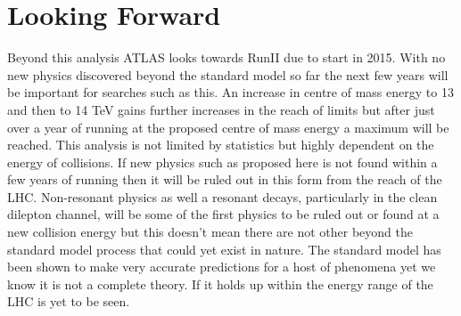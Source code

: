 \section{Looking Forward}

Beyond this analysis ATLAS looks towards RunII due to start in 2015. With no new physics discovered beyond the standard model so far the next few years will be important for searches such as this. An increase in centre of mass energy to 13 and then to 14 TeV gains further increases in the reach of limits but after just over a year of running at the proposed centre of mass energy a maximum will be reached. This analysis is not limited by statistics but highly dependent on the energy of collisions. If new physics such as proposed here is not found within a few years of running then it will be ruled out in this form from the reach of the LHC. Non-resonant physics as well a resonant decays, particularly in the clean dilepton channel, will be some of the first physics to be ruled out or found at a new collision energy but this doesn't mean there are not other beyond the standard model process that could yet exist in nature. The standard model has been shown to make very accurate predictions for a host of phenomena yet we know it is not a complete theory. If it holds up within the energy range of the LHC is yet to be seen. 



